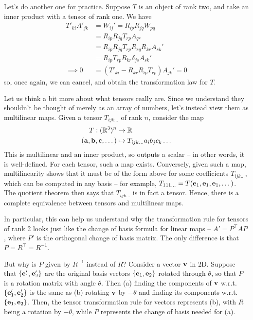 \documentclass{../template/note}
\begin{document}
    Let's do another one for practice. Suppose \(T\) is an object of rank two, and take an inner product with a tensor of rank one. We have
    \begin{align*}
        T'_{ki}A'_{jk} &= W_{ij}' = R_{ip}R_{jq}W_{pq} \\
        &= R_{ip}R_{jq}T_{rp}A_{qr} \\
        &= R_{ip}R_{jq}T_{rp}R_{sq}R_{kr}A_{sk}' \\
        &= R_{ip}T_{rp}R_{kr}\delta_{js}A_{sk}' \\
        \implies 0 &= (T'_{ki}-R_{kr}R_{ip}T_{rp})A_{jk}' = 0
    \end{align*}
    so, once again, we can cancel, and obtain the transformation law for \(T\).
    
    \begin{remark*}
        Let us think a bit more about what tensors really are. Since we understand they shouldn't be thought of merely as an array of numbers, let's instead view them as multilinear maps. Given a tensor \(T_{ijk\dots}\) of rank \(n\), consider the map
        \begin{align*}
            T: (\RR^3)^n &\to \RR \\
            (\V a, \V b, \V c, \dots) &\mapsto T_{ijk\dots} a_i b_j c_k \dots
        \end{align*}
        This is multilinear and an inner product, so outputs a scalar -- in other words, it is well-defined. For each tensor, such a map exists. Conversely, given such a map, multilinearity shows that it must be of the form above for some coefficients \(T_{ijk\dots}\), which can be computed in any basis -- for example, \(T_{111\dots} = T(\V e_1, \V e_1, \V e_1, \dots)\). The quotient theorem then says that \(T_{ijk\dots}\) is in fact a tensor. Hence, there is a complete equivalence between tensors and multilinear maps.

        In particular, this can help us understand why the transformation rule for tensors of rank 2 looks just like the change of basis formula for linear maps -- \(A' = P^\intercal AP\), where \(P'\) is the orthogonal change of basis matrix. The only difference is that \(P = R^\intercal = R^{-1}\).

        But why is \(P\) given by \(R^{-1}\) instead of \(R\)? Consider a vector \(\V v\) in 2D. Suppose that \(\{\V e_1', \V e_2'\}\) are the original basis vectors \(\{\V e_1, \V e_2\}\) rotated through \(\theta\), so that \(P\) is a rotation matrix with angle \(\theta\). Then (a) finding the components of \(\V v\) w.r.t. \(\{\V e_1', \V e_2'\}\) is the same as (b) rotating \(\V v\) by \(-\theta\) and finding its components w.r.t. \(\{\V e_1, \V e_2\}\). Then, the tensor transformation rule for vectors represents (b), with \(R\) being a rotation by \(-\theta\), while \(P\) represents the change of basis needed for (a).
    \end{remark*}
    
\end{document}

